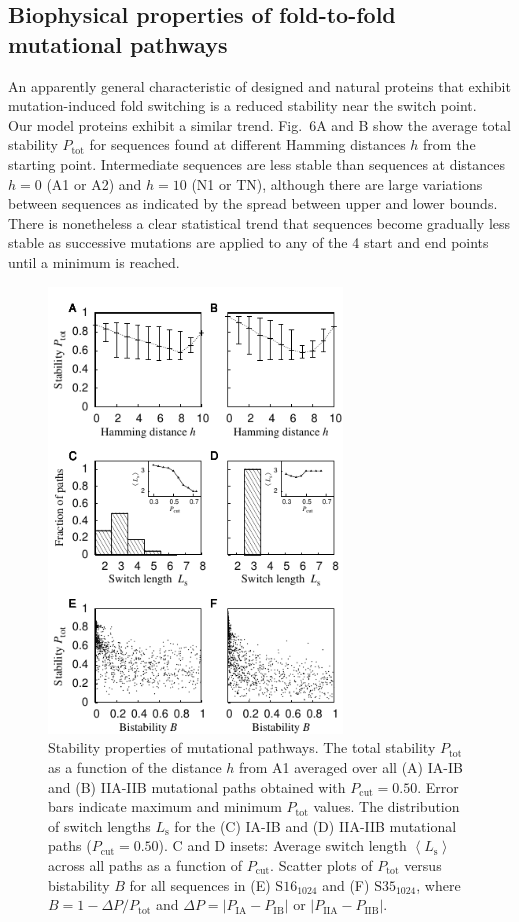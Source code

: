 \documentclass[
aip,
rsi,%
amsmath,amssymb,
reprint,%
]{revtex4-1}
\newcommand {\Pcut}     	{{P_\mathrm{cut}}}
\newcommand {\Ptot}	{{P_\mathrm{tot}}}
\newcommand {\PIA}    	{{P_\mathrm{IA}}}
\newcommand {\PIB}    	{{P_\mathrm{IB}}}
\newcommand {\PIIA}    	{{P_\mathrm{IIA}}}
\newcommand {\PIIB}    	{{P_\mathrm{IIB}}}
\newcommand {\SI}		{${\mathrm{S16}_{1024}}$}
\newcommand {\SII}		{${\mathrm{S35}_{1024}}$}
\begin{document}
\subsection{Biophysical properties of fold-to-fold mutational pathways}
\noindent 
An apparently general characteristic of designed and natural proteins that exhibit mutation-induced fold switching is a reduced stability near the switch point.~\cite{Alexander2009,He2012,Kouza2012,Sikosek2016,Sutto2012} Our model proteins exhibit a similar trend. Fig.~6A and B show the average total stability $\Ptot$ for sequences found at different Hamming distances $h$ from the starting point. Intermediate sequences are less stable than sequences at distances $h=0$ (A1 or A2) and $h=10$ (N1 or TN), although there are large variations between sequences as indicated by the spread between upper and lower bounds. There is nonetheless a clear statistical trend that sequences become gradually less stable as successive mutations are applied to any of the 4 start and end points until a minimum is reached. 

\begin{figure}
\includegraphics[width=7.8cm]{Paths}
\caption{Stability properties of mutational pathways. The total stability $\Ptot$ as a function of the distance $h$ from A1 averaged over all (A) IA-IB and (B) IIA-IIB mutational paths obtained with $\Pcut=0.50$. Error bars indicate maximum and minimum $\Ptot$ values. The distribution of switch lengths $L_\mathrm{s}$ for the (C) IA-IB and (D) IIA-IIB mutational paths ($\Pcut=0.50$). C and D insets: Average switch length $\left < L_\mathrm{s}\right >$ across all paths as a function of $\Pcut$. Scatter plots of $\Ptot$ versus bistability $B$ for all sequences in (E) {\SI} and (F) {\SII}, where $B=1-\Delta P/\Ptot$ and $\Delta P = |\PIA-\PIB|$ or $|\PIIA-\PIIB|$.}
\end{figure}
\end{document}
